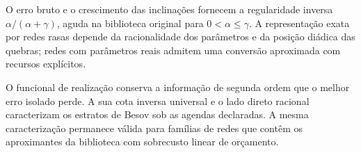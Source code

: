 O erro bruto e o crescimento das inclinações fornecem a regularidade inversa $\alpha/(\alpha+\gamma)$, aguda na biblioteca original para $0<\alpha\le\gamma$. A representação exata por redes rasas depende da racionalidade dos parâmetros e da posição diádica das quebras; redes com parâmetros reais admitem uma conversão aproximada com recursos explícitos.

O funcional de realização conserva a informação de segunda ordem que o melhor erro isolado perde. A sua cota inversa universal e o lado direto racional caracterizam os estratos de Besov sob as agendas declaradas. A mesma caracterização permanece válida para famílias de redes que contêm os aproximantes da biblioteca com sobrecusto linear de orçamento.
